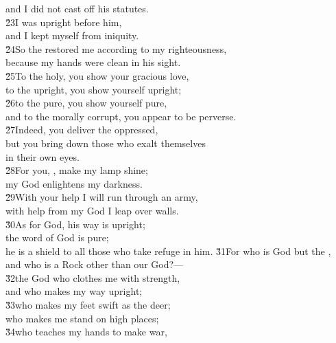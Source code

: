 \begin{poetry}
\poemll    and I did not cast off his statutes. \\
\poeml \v{23}I was upright before him, \\
\poemll    and I kept myself from iniquity. \\
\poeml \v{24}So the  restored me according to my righteousness, \\
\poemll    because my hands were clean in his sight. \\
\poeml \v{25}To the holy, you show your gracious love, \\
\poemll    to the upright, you show yourself upright; \\
\poeml \v{26}to the pure, you show yourself pure, \\
\poemll    and to the morally corrupt, you appear to be perverse. \\
\poeml \v{27}Indeed, you deliver the oppressed, \\
\poemll    but you bring down those who exalt themselves \\
\poemlll       in their own eyes. \\
\poeml \v{28}For you, , make my lamp shine; \\
\poemll    my God enlightens my darkness. \\
\poeml \v{29}With your help I will run through an army, \\
\poemll    with help from my God I leap over walls. \\
\poeml \v{30}As for God, his way is upright; \\
\poemll    the word of God is pure; \\
\poemlll       he is a shield to all those who take refuge in him.
\poeml \v{31}For who is God but the , \\
\poemll    and who is a Rock other than our God?--- \\
\poeml \v{32}the God who clothes me with strength, \\
\poemll    and who makes my way upright; \\
\poeml \v{33}who makes my feet swift as the deer; \\
\poemll    who makes me stand on high places; \\
\poeml \v{34}who teaches my hands to make war, \\

\end{poetry}
